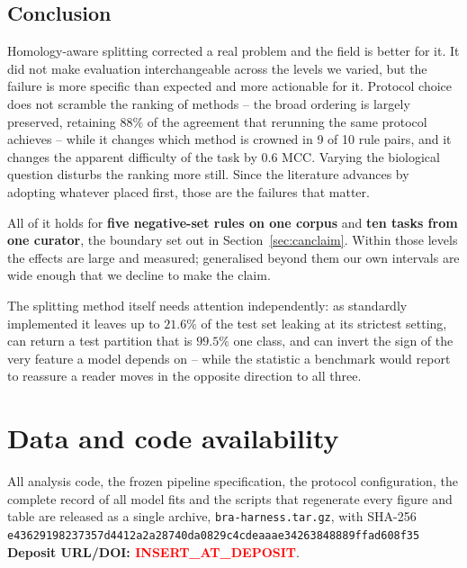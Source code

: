 \documentclass[11pt,a4paper]{article}
\begin{document}
\subsection{Conclusion}

Homology-aware splitting corrected a real problem and the field is better for it. It did
not make evaluation interchangeable across the levels we varied, but the failure is more
specific than expected and more actionable for it. Protocol choice does not scramble the
ranking of methods -- the broad ordering is largely preserved, retaining $88\%$ of the
agreement that rerunning the same protocol achieves -- while it changes which method is
crowned in 9 of 10 rule pairs, and it changes the apparent difficulty of the task by
$0.6$ MCC. Varying the biological question disturbs the ranking more still. Since the
literature advances by adopting whatever placed first, those are the failures that matter.

All of it holds for \textbf{five negative-set rules on one corpus} and \textbf{ten tasks
from one curator}, the boundary set out in Section~\ref{sec:canclaim}. Within those levels
the effects are large and measured; generalised beyond them our own intervals are wide
enough that we decline to make the claim.

The splitting method itself needs attention independently: as standardly implemented it
leaves up to $21.6\%$ of the test set leaking at its strictest setting, can return a test
partition that is $99.5\%$ one class, and can invert the sign of the very feature a model
depends on -- while the statistic a benchmark would report to reassure a reader moves in
the opposite direction to all three.

\section*{Data and code availability}

All analysis code, the frozen pipeline specification, the protocol configuration, the
complete record of all model fits and the scripts that regenerate every figure and table
are released as a single archive, \texttt{bra-harness.tar.gz}, with SHA-256\\
\texttt{e43629198237357d4412a2a28740da0829c4cdea}\-\texttt{aae34263848889ffad608f35}\\
\textbf{Deposit URL/DOI: \textcolor{red}{INSERT\_AT\_DEPOSIT}}.
\end{document}
